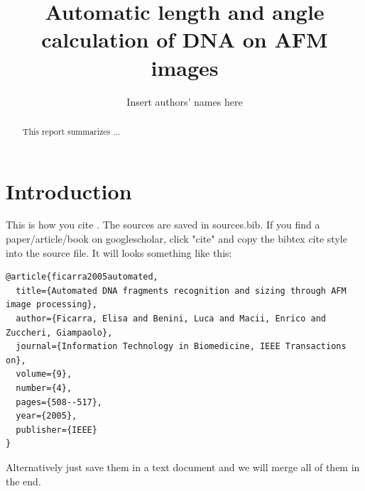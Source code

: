 \documentclass{article}
\begin{document}
%
\pagestyle{headings}  %
%
%

%

\title{Automatic length and angle calculation of DNA on AFM images}

\author{Insert authors' names here}

\maketitle  
\newpage
\tableofcontents
\newpage
%
\begin{abstract}
	This report summarizes ...
	
\end{abstract}

\section{Introduction}
This is how you cite \cite{ficarra2005automated}.
The sources are saved in sources.bib. If you find a paper/article/book on googlescholar, click "cite" and copy the bibtex cite style into the source file. It will looks something like this:
\begin{verbatim}
@article{ficarra2005automated,
  title={Automated DNA fragments recognition and sizing through AFM image processing},
  author={Ficarra, Elisa and Benini, Luca and Macii, Enrico and Zuccheri, Giampaolo},
  journal={Information Technology in Biomedicine, IEEE Transactions on},
  volume={9},
  number={4},
  pages={508--517},
  year={2005},
  publisher={IEEE}
}
\end{verbatim}
Alternatively just save them in a text document and we will merge all of them in the end. 
\end{document}
